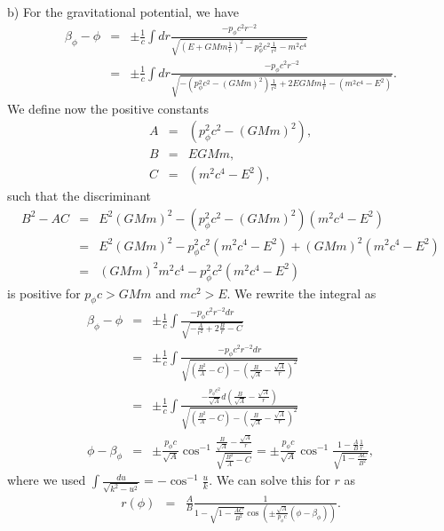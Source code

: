 \documentclass[letterpaper,11pt]{article}
\begin{document}
b) For the gravitational potential, we have
\begin{eqnarray*}
 \beta_\phi - \phi & = & \pm \frac{1}{c} \int dr \frac{-p_\phi c^2 r^{-2}}{\sqrt{\left(E + GMm\frac{1}{r}\right)^2 - p_\phi^2 c^2 \frac{1}{r^2} - m^2 c^4}} \\
 & = & \pm \frac{1}{c} \int dr \frac{-p_\phi c^2 r^{-2}}{\sqrt{- \left( p_\phi^2 c^2 - (GMm)^2 \right) \frac{1}{r^2} + 2EGMm\frac{1}{r} - \left(m^2 c^4 - E^2\right)}}.
\end{eqnarray*}
We define now the positive constants
\begin{eqnarray*}
 A & = & \left(p_\phi^2 c^2 - (GMm)^2\right), \\
 B & = & EGMm, \\
 C & = & \left(m^2 c^4 - E^2\right),
\end{eqnarray*}
such that the discriminant
\begin{eqnarray*}
 B^2 - AC & = & E^2 (GMm)^2 - (p_\phi^2 c^2 - (GMm)^2) (m^2 c^4 - E^2) \\
 & = & E^2 (GMm)^2 - p_\phi^2 c^2 (m^2 c^4 - E^2) + (GMm)^2 (m^2 c^4 - E^2) \\
 & = & (GMm)^2 m^2 c^4 - p_\phi^2 c^2 (m^2 c^4 - E^2)
\end{eqnarray*}
is positive for $p_\phi c > GMm$ and $mc^2 > E$.  We rewrite the integral as
\begin{eqnarray*}
 \beta_\phi - \phi & = & \pm \frac{1}{c} \int \frac{-p_\phi c^2 r^{-2} dr}{\sqrt{ - \frac{A}{r^2} + 2 \frac{B}{r} - C}} \\
 & = & \pm \frac{1}{c} \int \frac{-p_\phi c^2 r^{-2} dr}{\sqrt{\left(\frac{B^2}{A} - C\right) - \left(\frac{B}{\sqrt{A}} - \frac{\sqrt{A}}{r}\right)^2}} \\
 & = & \pm \frac{1}{c} \int \frac{-\frac{p_\phi c^2}{\sqrt{A}} d\left(\frac{B}{\sqrt{A}} - \frac{\sqrt{A}}{r}\right)}{\sqrt{\left(\frac{B^2}{A} - C\right) - \left(\frac{B}{\sqrt{A}} - \frac{\sqrt{A}}{r}\right)^2}} \\
 \phi - \beta_\phi & = & \pm \frac{p_\phi c}{\sqrt{A}} \cos^{-1} \frac{\frac{B}{\sqrt{A}} - \frac{\sqrt{A}}{r}}{\sqrt{\frac{B^2}{A} - C}} = \pm \frac{p_\phi c}{\sqrt{A}} \cos^{-1} \frac{1 - \frac{A}{B}\frac{1}{r}}{\sqrt{1 - \frac{AC}{B^2}}},
\end{eqnarray*}
where we used $\int \frac{du}{\sqrt{k^2 - u^2}} = -\cos^{-1} \frac{u}{k}$.  We can solve this for $r$ as
\begin{eqnarray*}
 r(\phi) & = & \frac{A}{B} \frac{1}{1 - \sqrt{1 - \frac{AC}{B^2}} \cos\left(\pm \frac{\sqrt{A}}{p_\phi c} (\phi - \beta_\phi)\right)}.
\end{eqnarray*}
\end{document}
